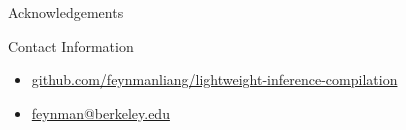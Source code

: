 \documentclass[final]{beamer}
\newlength{\onecolwid}
\begin{document}
\begin{frame}[t,containsverbatim]
\begin{columns}[t]
\begin{column}{\onecolwid}
\begin{block}{Acknowledgements}
      \end{block}



      \begin{alertblock}{Contact Information}

        \begin{itemize}
          \item \href{https://github.com/feynmanliang/lightweight-inference-compilation}{github.com/feynmanliang/lightweight-inference-compilation}
          \item \href{mailto:feynman@berkeley.edu}{feynman@berkeley.edu}
        \end{itemize}

      \end{alertblock}



    \end{column} %

  \end{columns} %

\end{frame} %
\end{document}
